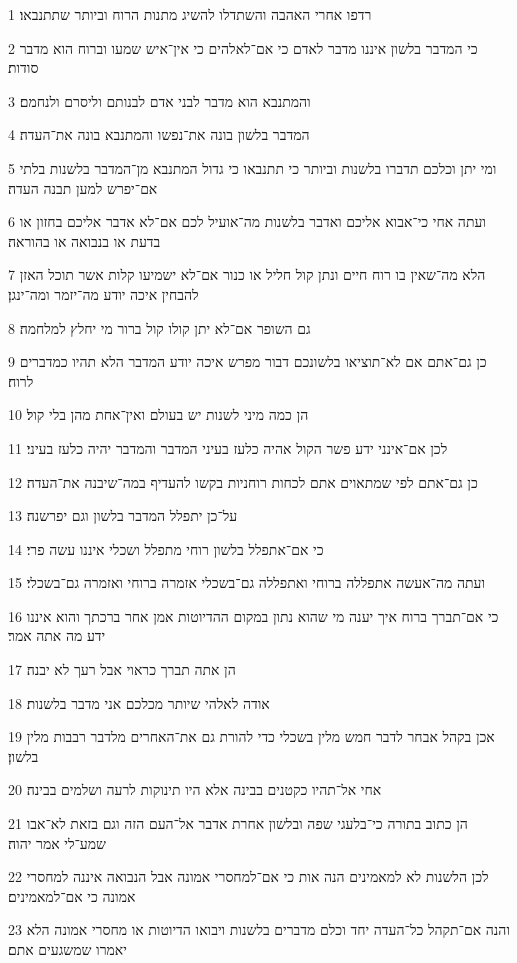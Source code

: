 \par 1 רדפו אחרי האהבה והשתדלו להשיג מתנות הרוח וביותר שתתנבאו׃
\par 2 כי המדבר בלשון איננו מדבר לאדם כי אם־לאלהים כי אין־איש שמעו וברוח הוא מדבר סודות׃
\par 3 והמתנבא הוא מדבר לבני אדם לבנותם וליסרם ולנחמם׃
\par 4 המדבר בלשון בונה את־נפשו והמתנבא בונה את־העדה׃
\par 5 ומי יתן וכלכם תדברו בלשנות וביותר כי תתנבאו כי גדול המתנבא מן־המדבר בלשנות בלתי אם־יפרש למען תבנה העדה׃
\par 6 ועתה אחי כי־אבוא אליכם ואדבר בלשנות מה־אועיל לכם אם־לא אדבר אליכם בחזון או בדעת או בנבואה או בהוראה׃
\par 7 הלא מה־שאין בו רוח חיים ונתן קול חליל או כנור אם־לא ישמיעו קלות אשר תוכל האזן להבחין איכה יודע מה־יזמר ומה־ינגן׃
\par 8 גם השופר אם־לא יתן קולו קול ברור מי יחלץ למלחמה׃
\par 9 כן גם־אתם אם לא־תוציאו בלשונכם דבור מפרש איכה יודע המדבר הלא תהיו כמדברים לרוח׃
\par 10 הן כמה מיני לשנות יש בעולם ואין־אחת מהן בלי קול׃
\par 11 לכן אם־אינני ידע פשר הקול אהיה כלעז בעיני המדבר והמדבר יהיה כלעז בעיני׃
\par 12 כן גם־אתם לפי שמתאוים אתם לכחות רוחניות בקשו להעדיף במה־שיבנה את־העדה׃
\par 13 על־כן יתפלל המדבר בלשון וגם יפרשנה׃
\par 14 כי אם־אתפלל בלשון רוחי מתפלל ושכלי איננו עשה פרי׃
\par 15 ועתה מה־אעשה אתפללה ברוחי ואתפללה גם־בשכלי אזמרה ברוחי ואזמרה גם־בשכלי׃
\par 16 כי אם־תברך ברוח איך יענה מי שהוא נתון במקום ההדיוטות אמן אחר ברכתך והוא איננו ידע מה אתה אמר׃
\par 17 הן אתה תברך כראוי אבל רעך לא יבנה׃
\par 18 אודה לאלהי שיותר מכלכם אני מדבר בלשנות׃
\par 19 אכן בקהל אבחר לדבר חמש מלין בשכלי כדי להורת גם את־האחרים מלדבר רבבות מלין בלשון׃
\par 20 אחי אל־תהיו כקטנים בבינה אלא היו תינוקות לרעה ושלמים בבינה׃
\par 21 הן כתוב בתורה כי־בלעגי שפה ובלשון אחרת אדבר אל־העם הזה וגם בזאת לא־אבו שמע־לי אמר יהוה׃
\par 22 לכן הלשנות לא למאמינים הנה אות כי אם־למחסרי אמונה אבל הנבואה איננה למחסרי אמונה כי אם־למאמינים׃
\par 23 והנה אם־תקהל כל־העדה יחד וכלם מדברים בלשנות ויבואו הדיוטות או מחסרי אמונה הלא יאמרו שמשגעים אתם׃
